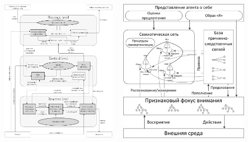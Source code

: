 \documentclass[default]{beamer}
\begin{document}
\begin{frame}
\begin{columns}
\begin{column}{0.5\textwidth}
			\end{column}
			\begin{column}{0.3\textwidth}
				\includegraphics[width=\textwidth]{strl/strl_arch_real_eng}
			\end{column}
			\begin{column}{0.2\textwidth}
				\includegraphics[width=\textwidth]{signs/iagent}
			\end{column}
			

\end{columns}
\end{frame}
\end{document}
